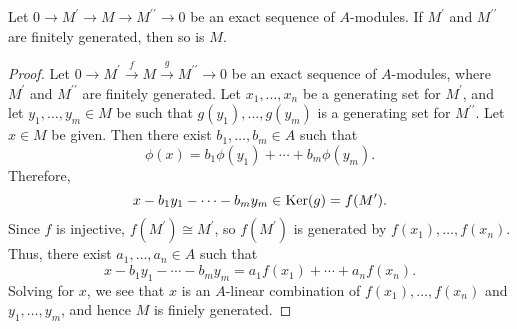 \begin{exercise}
\label{ex:2.8}

\end{exercise}

\begin{exercise}
\label{ex:2.9}
Let $0 \to M^\prime \to M \to M^{\prime\prime} \to 0$ be an exact sequence of $A$-modules.
If $M^\prime$ and $M^{\prime\prime}$ are finitely generated, then so is $M$.
\end{exercise}

\begin{proof}
Let $0 \to M^\prime \overset f \to M \overset g \to M^{\prime\prime} \to 0$ be an exact sequence of $A$-modules, where $M^\prime$ and $M^{\prime\prime}$ are finitely generated.
Let $x_1,\ldots,x_n$ be a generating set for $M^\prime$, and let $y_1,\ldots,y_m\in M$ be such that $g(y_1),\ldots,g(y_m)$ is a generating set for $M^{\prime\prime}$.
Let $x \in M$ be given.
Then there exist $b_1,\ldots,b_m \in A$ such that
\begin{equation*}
\phi(x) = b_1 \phi(y_1) + \cdots + b_m \phi(y_m).
\end{equation*}
Therefore,
\begin{equation*}
x - b_1 y_1 - \cdots - b_m y_m \in \operatorname{Ker}(g) = f(M^\prime).
\end{equation*}
Since $f$ is injective, $f(M^\prime) \cong M^\prime$, so $f(M^\prime)$ is generated by $f(x_1),\ldots,f(x_n)$.
Thus, there exist $a_1,\ldots,a_n \in A$ such that
\begin{equation*}
x - b_1 y_1 - \cdots - b_m y_m = a_1 f(x_1) + \cdots + a_n f(x_n).
\end{equation*}
Solving for $x$, we see that $x$ is an $A$-linear combination of $f(x_1),\ldots,f(x_n)$ and $y_1,\ldots,y_m$, and hence $M$ is finiely generated.
\end{proof}











\begin{exercise}
\label{ex:2.10}

\end{exercise}








\begin{exercise}
\label{ex:2.11}

\end{exercise}








